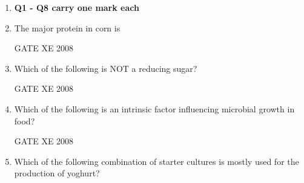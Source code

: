 \documentclass[12pt]{article}
\begin{document}
\begin{enumerate}[label=Q\arabic*.]
\item[] \textbf{Q1 - Q8 carry one mark each}



    \item The major protein in corn is
\begin{enumerate}[label=(\Alph*)]
\end{enumerate}
    
    GATE XE 2008

    \item Which of the following is NOT a reducing sugar? 
\begin{enumerate}[label=(\Alph*)]
\end{enumerate}
    
    GATE XE 2008

    \item Which of the following is an intrinsic factor influencing microbial growth in food? 

\begin{enumerate}[label=(\Alph*)]
\end{enumerate}
    
    GATE XE 2008

    \item Which of the following combination of starter cultures is mostly used for the production of yoghurt? 


\end{enumerate}
\end{document}
